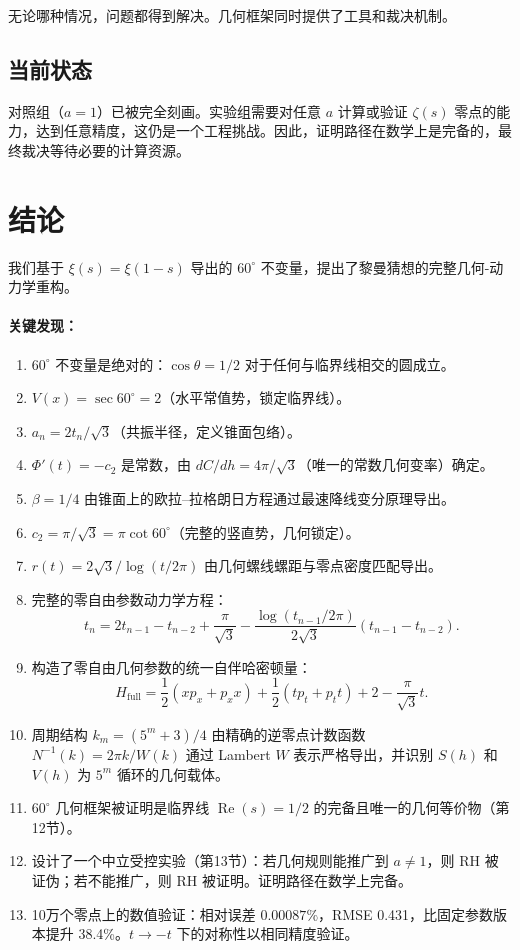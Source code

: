 \documentclass[12pt,a4paper]{article}
\begin{document}
无论哪种情况，问题都得到解决。几何框架同时提供了工具和裁决机制。

\subsection{当前状态}

对照组（$a=1$）已被完全刻画。实验组需要对任意 $a$ 计算或验证 $\zeta(s)$ 零点的能力，达到任意精度，这仍是一个工程挑战。因此，证明路径在数学上是完备的，最终裁决等待必要的计算资源。

\section{结论}

我们基于 $\xi(s)=\xi(1-s)$ 导出的 $60^\circ$ 不变量，提出了黎曼猜想的完整几何-动力学重构。

\paragraph{关键发现：}
\begin{enumerate}
\item $60^\circ$ 不变量是绝对的：$\cos\theta = 1/2$ 对于任何与临界线相交的圆成立。
\item $V(x) = \sec 60^\circ = 2$（水平常值势，锁定临界线）。
\item $a_n = 2t_n/\sqrt{3}$（共振半径，定义锥面包络）。
\item $\Phi'(t) = -c_2$ 是常数，由 $dC/dh = 4\pi/\sqrt{3}$（唯一的常数几何变率）确定。
\item $\beta = 1/4$ 由锥面上的欧拉--拉格朗日方程通过最速降线变分原理导出。
\item $c_2 = \pi/\sqrt{3} = \pi\cot 60^\circ$（完整的竖直势，几何锁定）。
\item $r(t) = 2\sqrt{3}/\log(t/2\pi)$ 由几何螺线螺距与零点密度匹配导出。
\item 完整的零自由参数动力学方程：
\begin{equation}
t_n = 2t_{n-1} - t_{n-2} + \frac{\pi}{\sqrt{3}} - \frac{\log(t_{n-1}/2\pi)}{2\sqrt{3}}(t_{n-1} - t_{n-2}).
\end{equation}
\item 构造了零自由几何参数的统一自伴哈密顿量：
\begin{equation}
H_{\text{full}} = \frac{1}{2}(x p_x + p_x x) + \frac{1}{2}(t p_t + p_t t) + 2 - \frac{\pi}{\sqrt{3}}t.
\end{equation}
\item 周期结构 $k_m = (5^m+3)/4$ 由精确的逆零点计数函数 $N^{-1}(k) = 2\pi k/W(k)$ 通过 Lambert $W$ 表示严格导出，并识别 $S(h)$ 和 $V(h)$ 为 $5^m$ 循环的几何载体。
\item $60^\circ$ 几何框架被证明是临界线 $\operatorname{Re}(s)=1/2$ 的完备且唯一的几何等价物（第12节）。
\item 设计了一个中立受控实验（第13节）：若几何规则能推广到 $a \neq 1$，则 RH 被证伪；若不能推广，则 RH 被证明。证明路径在数学上完备。
\item 10万个零点上的数值验证：相对误差 $0.00087\%$，RMSE 0.431，比固定参数版本提升 38.4\%。$t \to -t$ 下的对称性以相同精度验证。
\end{enumerate}
\end{document}
